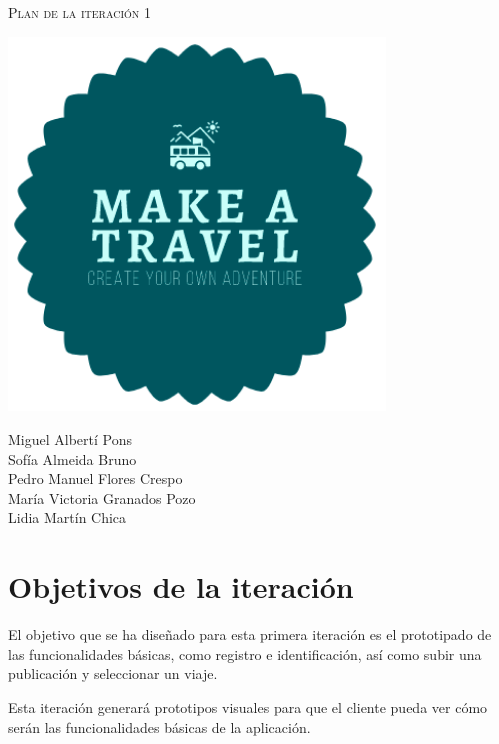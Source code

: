 \documentclass[11pt]{article}
\begin{document}
\begin{titlepage}
\centering
\vspace{4.5cm}
{\scshape\LARGE Plan de la iteración 1\par}
\vspace{1.5cm}

\includegraphics[width=10cm] {Logo}

\vspace{3cm}
{\scshape\large \par}
\vspace{1cm}

{Miguel Albertí Pons\\
Sofía Almeida Bruno\\
Pedro Manuel Flores Crespo\\
María Victoria Granados Pozo\\
Lidia Martín Chica
\par}

\end{titlepage}

\newpage

\section{Objetivos de la iteración}
El objetivo que se ha diseñado para esta primera iteración es el prototipado de las funcionalidades básicas, como registro e identificación, así como subir una publicación y seleccionar un viaje.

Esta iteración generará prototipos visuales para que el cliente pueda ver cómo serán las funcionalidades básicas de la aplicación.
\end{document}

